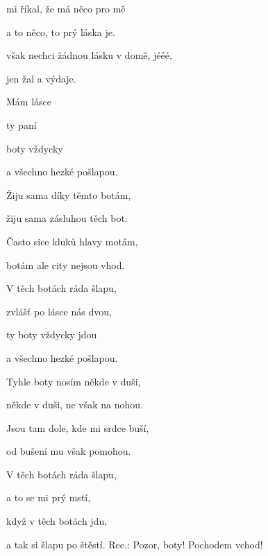 

\zs
{} mi říkal, že má něco pro mě

a to něco, to prý láska je.

 však nechci žádnou lásku v domě, jééé,

 jen žal a výdaje.

Mám  lásce 

ty  paní 

 boty vždycky 

a všechno hezké pošlapou.
\ks

\zs
Žiju sama díky těmto botám,

žiju sama zásluhou těch bot.

Často sice kluků hlavy motám,

botám ale city nejsou vhod.

V těch botách ráda šlapu,

zvlášť po lásce nás dvou,

ty boty vždycky jdou

a všechno hezké pošlapou.
\ks

\zs
Tyhle boty nosím někde v duši,

někde v duši, ne však na nohou.

Jsou tam dole, kde mi srdce buší,

od bušení mu však pomohou.

V těch botách ráda šlapu,

a to se mi prý mstí,

když v těch botách jdu,

a tak si šlapu po štěstí. Rec.: Pozor, boty! Pochodem vchod!
\ks

\kp






















